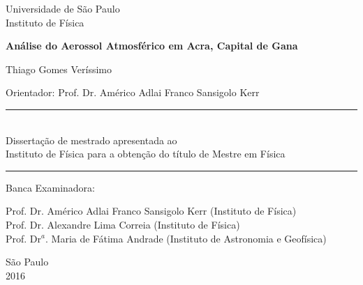 \begin{titlepage}
\setlength{\voffset}{0pt}
\setlength{\hoffset}{0pt}
\centering
\Large{Universidade de São Paulo \\
Instituto de Física}


\LARGE{\bf Análise do Aerossol Atmosférico em Acra, Capital de Gana
}


\Large{ Thiago Gomes Veríssimo
}


\begin{flushright}

\begin{minipage}{.6\textwidth}
\large{Orientador: Prof. Dr. Américo Adlai Franco Sansigolo Kerr
}
\end{minipage}


\begin{minipage}{.6\textwidth}
\rule{\linewidth}{0.5mm}\\
\large{
Dissertação de mestrado apresentada ao \\ Instituto de Física para a obtenção do 
título de Mestre em Física
}

\rule{\linewidth}{0.5mm}
\end{minipage}
\end{flushright}


\begin{flushleft}

\normalsize

Banca Examinadora:\\
\hspace{.03\textwidth}

\begin{minipage}{.97\textwidth}
  Prof. Dr. Américo Adlai Franco Sansigolo Kerr (Instituto de Física) \\
  Prof. Dr. Alexandre Lima Correia (Instituto de Física) \\
  Prof. Dr$^a$. Maria de Fátima Andrade (Instituto de Astronomia e Geofísica) \\
\end{minipage}

\end{flushleft}


São Paulo\\
2016

\end{titlepage}

